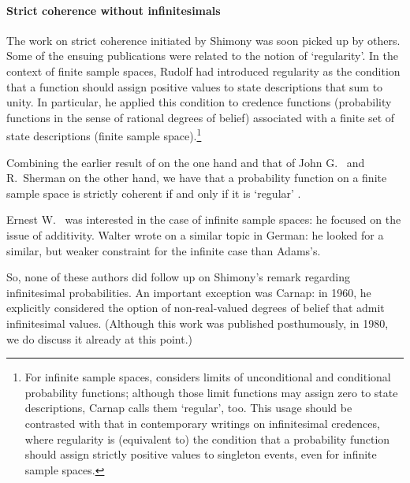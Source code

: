 \paragraph{Strict coherence without infinitesimals}
The work on strict coherence initiated by Shimony was soon picked up by others. Some of the ensuing publications were related to the notion of `regularity'. In the context of finite sample spaces, Rudolf \citet[Ch.~5]{Carnap:1950} had introduced regularity as the condition that a function should assign positive values to state descriptions that sum to unity. In particular, he applied this condition to credence functions (probability functions in the sense of rational degrees of belief) associated with a finite set of state descriptions (finite sample space).\footnote{For infinite sample spaces, \citet{Carnap:1950} considers limits of unconditional and conditional probability functions; although those limit functions may assign zero to state descriptions, Carnap calls them `regular', too. This usage should be contrasted with that in contemporary writings on infinitesimal credences, where regularity is (equivalent to) the condition that a probability function should assign strictly positive values to singleton events, even for infinite sample spaces.}

Combining the earlier result of \citet{Shimony:1955} on the one hand and that of John G.~\citet{Kemeny:1955} and R.~Sherman \citet{Lehman:1955} on the other hand, we have that a probability function on a finite sample space is strictly coherent if and only if it is `regular' \citep[\textit{cf}.][p.~15]{Carnap:1971a}.

Ernest W.~\citet{Adams:1959,Adams:1962,Adams:1964} was interested in the case of infinite sample spaces: he focused on the issue of  additivity. Walter \citet{Oberschelp:1962} wrote on a similar topic in German: he looked for a similar, but weaker constraint for the infinite case than Adams's.

So, none of these authors did follow up on Shimony's remark regarding infinitesimal probabilities.
An important exception was Carnap: in 1960, he explicitly considered the option of non-real-valued degrees of belief that admit infinitesimal values. (Although this work was published posthumously, in 1980, we do discuss it already at this point.)

